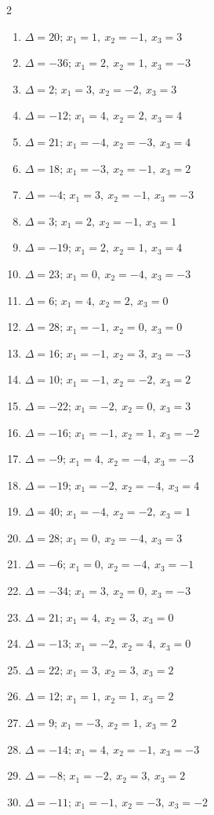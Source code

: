 \begin{multicols}{2}\raggedright
\begin{enumerate}[label=\arabic*., leftmargin=*, itemsep=1pt]
\item $\Delta=20;\,x_1=1,\ x_2=-1,\ x_3=3$
\item $\Delta=-36;\,x_1=2,\ x_2=1,\ x_3=-3$
\item $\Delta=2;\,x_1=3,\ x_2=-2,\ x_3=3$
\item $\Delta=-12;\,x_1=4,\ x_2=2,\ x_3=4$
\item $\Delta=21;\,x_1=-4,\ x_2=-3,\ x_3=4$
\item $\Delta=18;\,x_1=-3,\ x_2=-1,\ x_3=2$
\item $\Delta=-4;\,x_1=3,\ x_2=-1,\ x_3=-3$
\item $\Delta=3;\,x_1=2,\ x_2=-1,\ x_3=1$
\item $\Delta=-19;\,x_1=2,\ x_2=1,\ x_3=4$
\item $\Delta=23;\,x_1=0,\ x_2=-4,\ x_3=-3$
\item $\Delta=6;\,x_1=4,\ x_2=2,\ x_3=0$
\item $\Delta=28;\,x_1=-1,\ x_2=0,\ x_3=0$
\item $\Delta=16;\,x_1=-1,\ x_2=3,\ x_3=-3$
\item $\Delta=10;\,x_1=-1,\ x_2=-2,\ x_3=2$
\item $\Delta=-22;\,x_1=-2,\ x_2=0,\ x_3=3$
\item $\Delta=-16;\,x_1=-1,\ x_2=1,\ x_3=-2$
\item $\Delta=-9;\,x_1=4,\ x_2=-4,\ x_3=-3$
\item $\Delta=-19;\,x_1=-2,\ x_2=-4,\ x_3=4$
\item $\Delta=40;\,x_1=-4,\ x_2=-2,\ x_3=1$
\item $\Delta=28;\,x_1=0,\ x_2=-4,\ x_3=3$
\item $\Delta=-6;\,x_1=0,\ x_2=-4,\ x_3=-1$
\item $\Delta=-34;\,x_1=3,\ x_2=0,\ x_3=-3$
\item $\Delta=21;\,x_1=4,\ x_2=3,\ x_3=0$
\item $\Delta=-13;\,x_1=-2,\ x_2=4,\ x_3=0$
\item $\Delta=22;\,x_1=3,\ x_2=3,\ x_3=2$
\item $\Delta=12;\,x_1=1,\ x_2=1,\ x_3=2$
\item $\Delta=9;\,x_1=-3,\ x_2=1,\ x_3=2$
\item $\Delta=-14;\,x_1=4,\ x_2=-1,\ x_3=-3$
\item $\Delta=-8;\,x_1=-2,\ x_2=3,\ x_3=2$
\item $\Delta=-11;\,x_1=-1,\ x_2=-3,\ x_3=-2$
\end{enumerate}
\end{multicols}

